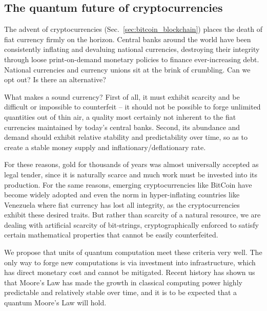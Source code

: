 %
%

\subsection{The quantum future of cryptocurrencies}\label{sec:quant_coin_essay}

The advent of cryptocurrencies (Sec.~\ref{sec:bitcoin_blockchain}) places the death of fiat currency firmly on the horizon. Central banks around the world have been consistently inflating and devaluing national currencies, destroying their integrity through loose print-on-demand monetary policies to finance ever-increasing debt. National currencies and currency unions sit at the brink of crumbling. Can we opt out? Is there an alternative?

What makes a sound currency? First of all, it must exhibit scarcity and be difficult or impossible to counterfeit -- it should not be possible to forge unlimited quantities out of thin air, a quality most certainly not inherent to the fiat currencies maintained by today's central banks. Second, its abundance and demand should exhibit relative stability and predictability over time, so as to create a stable money supply and inflationary/deflationary rate.

For these reasons, gold for thousands of years was almost universally accepted as legal tender, since it is naturally scarce and much work must be invested into its production. For the same reasons, emerging cryptocurrencies like BitCoin have become widely adopted and even the norm in hyper-inflating countries like Venezuela where fiat currency has lost all integrity, as the cryptocurrencies exhibit these desired traits. But rather than scarcity of a natural resource, we are dealing with artificial scarcity of bit-strings, cryptographically enforced to satisfy certain mathematical properties that cannot be easily counterfeited.

We propose that units of quantum computation meet these criteria very well. The only way to forge new computations is via investment into infrastructure, which has direct monetary cost and cannot be mitigated. Recent history has shown us that Moore's Law has made the growth in classical computing power highly predictable and relatively stable over time, and it is to be expected that a quantum Moore's Law will hold.

